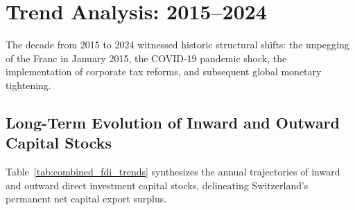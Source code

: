 
\section{Trend Analysis: 2015--2024}

The decade from 2015 to 2024 witnessed historic structural shifts: the unpegging of the Franc in January 2015, the COVID-19 pandemic shock, the implementation of corporate tax reforms, and subsequent global monetary tightening.

\subsection{Long-Term Evolution of Inward and Outward Capital Stocks}

Table~\ref{tab:combined_fdi_trends} synthesizes the annual trajectories of inward and outward direct investment capital stocks, delineating Switzerland's permanent net capital export surplus.

